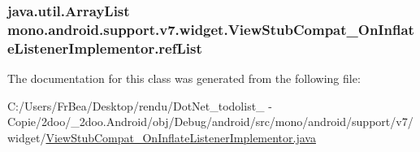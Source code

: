 \hypertarget{classmono_1_1android_1_1support_1_1v7_1_1widget_1_1_view_stub_compat___on_inflate_listener_implementor_479175b46094c8c3cb0df597892611fc}{
\subsubsection[{refList}]{\setlength{\rightskip}{0pt plus 5cm}java.util.ArrayList {\bf mono.android.support.v7.widget.ViewStubCompat\_\-OnInflateListenerImplementor.refList}}}
\label{classmono_1_1android_1_1support_1_1v7_1_1widget_1_1_view_stub_compat___on_inflate_listener_implementor_479175b46094c8c3cb0df597892611fc}




The documentation for this class was generated from the following file:\begin{CompactItemize}
\item 
C:/Users/FrBea/Desktop/rendu/DotNet\_\-todolist\_ - Copie/2doo/\_\-2doo.Android/obj/Debug/android/src/mono/android/support/v7/widget/\hyperlink{_view_stub_compat___on_inflate_listener_implementor_8java}{ViewStubCompat\_\-OnInflateListenerImplementor.java}\end{CompactItemize}
